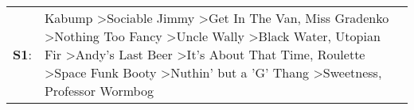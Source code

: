 \begin{supertabular}{p{0.03\textwidth}p{0.92\textwidth}}
 \textbf{S1}:  &  Kabump\textsuperscript{} \textgreater \enspace Sociable Jimmy\textsuperscript{} \textgreater \enspace Get In The Van\textsuperscript{}, \enspace Miss Gradenko\textsuperscript{} \textgreater \enspace Nothing Too Fancy\textsuperscript{} \textgreater \enspace Uncle Wally\textsuperscript{} \textgreater \enspace Black Water\textsuperscript{}, \enspace Utopian Fir\textsuperscript{} \textgreater \enspace Andy's Last Beer\textsuperscript{} \textgreater \enspace It's About That Time\textsuperscript{}, \enspace Roulette\textsuperscript{} \textgreater \enspace Space Funk Booty\textsuperscript{} \textgreater \enspace Nuthin' but a 'G' Thang\textsuperscript{} \textgreater \enspace Sweetness\textsuperscript{}, \enspace Professor Wormbog\textsuperscript{}  \enspace  \\
\end{supertabular}
